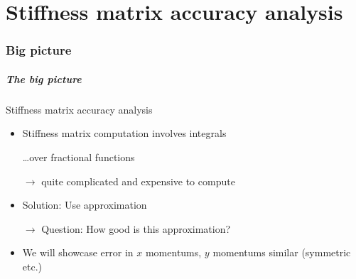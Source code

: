 \documentclass{beamer}
\renewcommand{\phi}{\varphi}
\begin{document}

\part{Stiffness matrix accuracy analysis}
\label{part:stiffness-matrix-accuracy-analysis}

\section{Big picture}
\label{sec:stiffness-big-picture}

\begin{frame}
  \frametitle{The big picture}
  \begin{block}{Stiffness matrix accuracy analysis}
    \begin{itemize}
    \item Stiffness matrix computation involves integrals

      \dots over fractional functions

      $\rightarrow$ quite complicated and expensive to compute
    \item Solution: Use approximation

      $\rightarrow$ \alert<2>{Question: How good is this approximation?}
    \item We will showcase error in $x$ momentums, $y$ momentums similar (symmetric etc.)
    \end{itemize}
  \end{block}
\end{frame}
\end{document}
